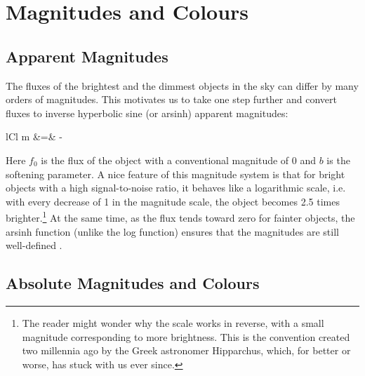\section{Magnitudes and Colours} 

\subsection{Apparent Magnitudes} 

The fluxes of the brightest and the dimmest objects in the sky can differ by many orders of
magnitudes. This motivates us to take one step further and convert fluxes to inverse hyperbolic sine
(or arsinh) apparent magnitudes:
	\begin{IEEEeqnarray*}{lCl}
		m &=& - 
	\end{IEEEeqnarray*}
Here $f_0$ is the flux of the object with a conventional magnitude of 0 and $b$ is the softening
parameter. A nice feature of this magnitude system is that for bright objects with a high
signal-to-noise ratio, it behaves like a logarithmic scale, i.e. with every decrease of 1 in the
magnitude scale, the object becomes 2.5 times brighter.\footnote{ The reader might wonder why the
	scale works in reverse, with a small magnitude corresponding to more brightness. This is the
	convention created two millennia ago by the Greek astronomer Hipparchus, which, for better or worse,
	has stuck with us ever since.} At the same time, as the flux tends toward zero for fainter objects,
the arsinh function (unlike the log function) ensures that the magnitudes are still well-defined
\cite{lupton99}.

\subsection{Absolute Magnitudes and Colours}  
\label{sub:colours}

